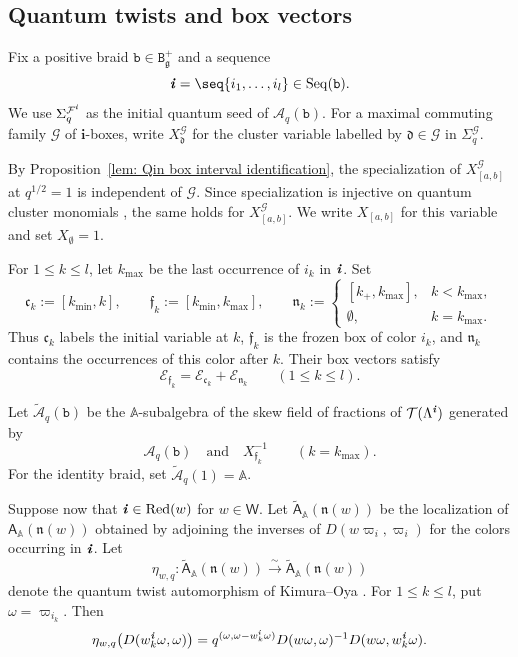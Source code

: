 \documentclass[12pt, leqno]{amsart}
\numberwithin{equation}{section}
\theoremstyle{plain}
\theoremstyle{definition}
\renewcommand{\le}{\leqslant}
\newcommand{\seteq}{\mathbin{:=}}
\newcommand{\g}{\mathfrak{g}}
\newcommand{\n}{\mathfrak{n}}
\newcommand{\ii}{ \textbf{\textit{i}}}
\newcommand{\frakc}{\mathfrak{c}}
\newcommand{\frakd}{\mathfrak{d}}
\newcommand{\frakf}{\mathfrak{f}}
\newcommand{\frakn}{\mathfrak{n}}
\newcommand{\sfA}{\mathsf{A}}
\newcommand{\sfW}{\mathsf{W}}
\newcommand{\tsfA}{\widetilde{\sfA}}
\newcommand{\bbA}{\mathbb{A}}
\newcommand{\bfi}{\mathbf{i}}
\newcommand{\calA}{\mathcal{A}}
\newcommand{\calE}{\mathcal{E}}
\newcommand{\calF}{\mathcal{F}}
\newcommand{\calG}{\mathcal{G}}
\newcommand{\calT}{\mathcal{T}}
\newcommand{\tcalA}{\widetilde{\calA}}
\newcommand{\ttB}{\mathtt{B}}
\newcommand{\ttb}{\mathtt{b}}
\newcommand{\weyl}{\sfW}
\newcommand{\Red}{\mathrm{Red}}
\newcommand{\Seq}{\mathrm{Seq}}
\begin{document}
\subsection{Quantum twists and box vectors}
\label{subsec: reduced twists and box vectors}

Fix a positive braid $\ttb\in\ttB_\g^+$ and a sequence
\[
\ii=\seq{i_1,\ldots,i_l}\in\Seq(\ttb).
\]
We use $\Sigma_q^{\calF^\ii}$ as the initial quantum seed of
$\calA_q(\ttb)$.
For a maximal commuting family $\calG$ of $\bfi$-boxes, write
$X^\calG_{\frakd}$ for the cluster variable labelled by
$\frakd\in\calG$ in $\Sigma_q^\calG$.

By Proposition~\ref{lem: Qin box interval identification}, the
specialization of $X^\calG_{[a,b]}$ at $q^{1/2}=1$ is independent
of $\calG$.  Since specialization is injective on quantum cluster
monomials \cite[Lemma~A.4]{FHOO2}, the same holds for
$X^\calG_{[a,b]}$.
We write $X_{[a,b]}$ for this variable and set $X_\emptyset=1$.

For $1\le k\le l$, let $k_{\max}$ be the last occurrence of
$i_k$ in $\ii$.  Set
\begin{equation}
\frakc_k\seteq[k_{\min},k],
\qquad
\frakf_k\seteq[k_{\min},k_{\max}],
\qquad
\frakn_k\seteq
\begin{cases}
[k_+,k_{\max}],&k<k_{\max},\\
\emptyset,&k=k_{\max}.
\end{cases}
\label{eq: twist initial frozen suffix boxes}
\end{equation}
Thus $\frakc_k$ labels the initial variable at $k$,
$\frakf_k$ is the frozen box of color $i_k$, and
$\frakn_k$ contains the occurrences of this color after $k$.
Their box vectors satisfy
\begin{equation}
\calE_{\frakf_k}=\calE_{\frakc_k}+\calE_{\frakn_k}
\qquad(1\le k\le l).
\label{eq: twist box vector decomposition}
\end{equation}

Let $\tcalA_q(\ttb)$ be the $\bbA$-subalgebra of the skew
field of fractions of $\calT(\Lambda^\ii)$ generated by
\[
\calA_q(\ttb)
\quad\text{and}\quad
X_{\frakf_k}^{-1}\qquad(k=k_{\max}).
\]
For the identity braid, set $\tcalA_q(1)=\bbA$.

Suppose now that $\ii\in\Red(w)$ for $w\in\weyl$.
Let $\tsfA_\bbA(\n(w))$ be the localization of
$\sfA_\bbA(\n(w))$ obtained by adjoining the inverses of
$D(w\varpi_i,\varpi_i)$ for the colors occurring in $\ii$.
Let
\[
\eta_{w,q}:\tsfA_\bbA(\n(w))
\xrightarrow{\sim}\tsfA_\bbA(\n(w))
\]
denote the quantum twist automorphism of Kimura--Oya
\cite[Theorems~4.13 and~6.1]{KimuraOya21}.
For $1\le k\le l$, put $\omega=\varpi_{i_k}$.  Then
\begin{equation}
\eta_{w,q}\bigl(D(w_k^\ii\omega,\omega)\bigr)
=q^{(\omega,\omega-w_k^\ii\omega)}
D(w\omega,\omega)^{-1}D(w\omega,w_k^\ii\omega).
\label{eq: reduced quantum twist minor formula}
\end{equation}
\end{document}
